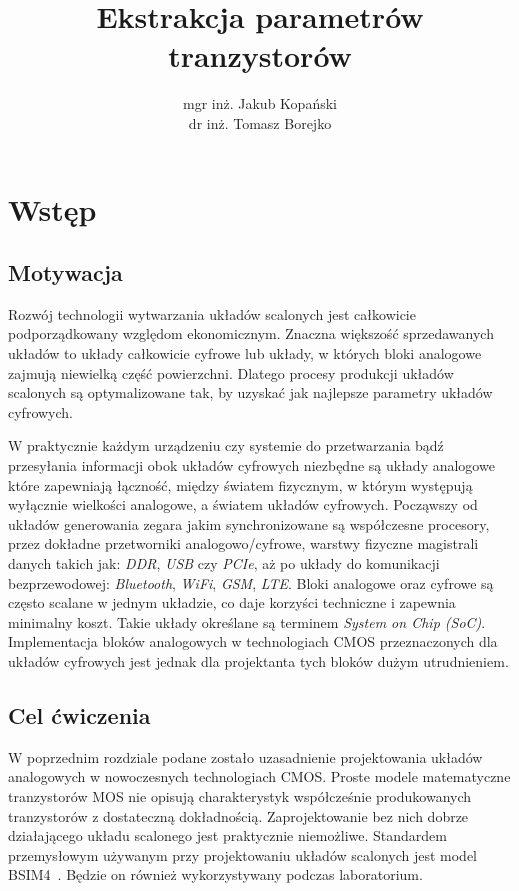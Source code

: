 \documentclass[twoside,pl,final]{labman}
\title{Ekstrakcja parametrów tranzystorów}
\author{mgr inż. Jakub Kopański\\
dr inż. Tomasz Borejko}
\begin{document}
\maketitle
\tableofcontents
\clearpage
\listoffigures
\clearpage
\listoftables
\clearpage

\chapter{Wstęp}
\label{intro}

\section{Motywacja}
\label{intro:motivation}

Rozwój technologii wytwarzania układów scalonych
jest całkowicie podporządkowany względom ekonomicznym.
Znaczna większość sprzedawanych układów to układy całkowicie cyfrowe lub układy,
w których bloki analogowe zajmują niewielką część powierzchni.
Dlatego procesy produkcji układów scalonych są optymalizowane tak,
by uzyskać jak najlepsze parametry układów cyfrowych.

W praktycznie każdym urządzeniu czy systemie do przetwarzania bądź przesyłania
informacji obok układów cyfrowych niezbędne są układy analogowe które
zapewniają łączność, między światem fizycznym,
w którym występują wyłącznie wielkości analogowe, a światem układów cyfrowych.
Począwszy od układów generowania zegara
jakim synchronizowane są współczesne procesory,
przez dokładne przetworniki analogowo/cyfrowe,
warstwy fizyczne magistrali danych takich jak:
\emph{DDR}, \emph{USB} czy \emph{PCIe},
aż po układy do komunikacji bezprzewodowej:
\emph{Bluetooth}, \emph{WiFi}, \emph{GSM}, \emph{LTE}.
Bloki analogowe oraz cyfrowe są często scalane w jednym układzie,
co daje korzyści techniczne i zapewnia minimalny koszt.
Takie układy określane są terminem \emph{System on Chip (SoC)}.
Implementacja bloków analogowych w technologiach CMOS przeznaczonych dla
układów cyfrowych jest jednak dla projektanta tych bloków dużym utrudnieniem.

\section{Cel ćwiczenia}
\label{intro:goal}

W poprzednim rozdziale podane zostało uzasadnienie projektowania
układów analogowych w nowoczesnych technologiach CMOS.
Proste modele matematyczne tranzystorów MOS nie opisują charakterystyk
współcześnie produkowanych tranzystorów z dostateczną dokładnością.
Zaprojektowanie bez nich dobrze działającego
układu scalonego jest praktycznie niemożliwe.
Standardem przemysłowym używanym przy projektowaniu układów scalonych
jest model BSIM4~\cite{bsim4:manual}.
Będzie on również wykorzystywany podczas laboratorium.
\end{document}
